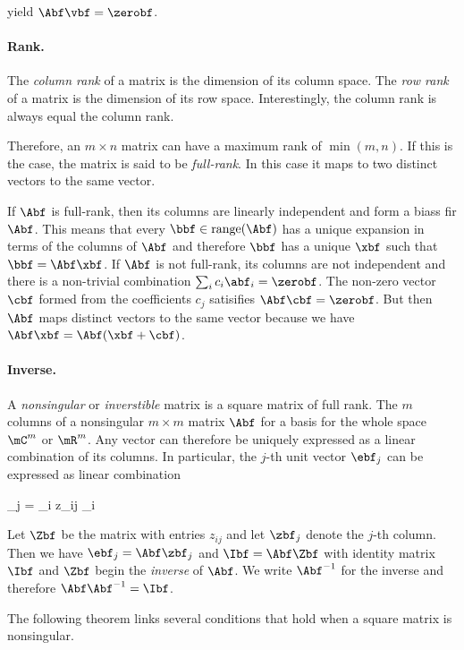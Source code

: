 yield $\Abf \vbf = \zerobf$.

\paragraph{Rank.} The \emph{column rank} of a matrix is the dimension of its column space. The \emph{row rank} of a matrix is the dimension of its row space. Interestingly, the column rank is always equal the column rank.

Therefore, an $m \times n$ matrix can have a maximum rank of $\min(m,n)$. If this is the case, the matrix is said to be \emph{full-rank}. In this case it maps to two distinct vectors to the same vector.

If $\Abf$ is full-rank, then its columns are linearly independent and form a biass fir $\Abf$. This means that every $\bbf \in \text{range}(\Abf)$ has a unique expansion in terms of the columns of $\Abf$ and therefore $\bbf$ has a unique $\xbf$ such that $\bbf = \Abf \xbf$. If $\Abf$ is not full-rank, its columns are not independent and there is a non-trivial combination $\sum_i c_i \abf_i = \zerobf$. The non-zero vector $\cbf$ formed from the coefficients $c_j$ satisifies $\Abf \cbf = \zerobf$. But then $\Abf$ maps distinct vectors to the same vector because we have $\Abf \xbf = \Abf(\xbf + \cbf)$.

\paragraph{Inverse.} 

A \emph{nonsingular} or \emph{inverstible} matrix is a square matrix of full rank. The $m$ columns of a nonsingular $m \times m$ matrix $\Abf$ for a basis for the whole space $\mC^m$ or $\mR^m$. Any vector can therefore be uniquely expressed as a linear combination of its columns. In particular, the $j$-th unit vector $\ebf_j$ can be expressed as linear combination

\bee
\ebf_j = \sum _i z_{ij} \abf_i
\eee

Let $\Zbf$ be the matrix with entries $z_{ij}$ and let $\zbf_j$ denote the $j$-th column. Then we have $\ebf_j = \Abf \zbf_j$ and $\Ibf = \Abf \Zbf$ with identity matrix $\Ibf$ and $\Zbf$ begin the \emph{inverse} of $\Abf$. We write $\Abf^{-1}$ for the inverse and therefore $\Abf \Abf^{-1} = \Ibf$.

The following theorem links several conditions that hold when a square matrix is nonsingular.


